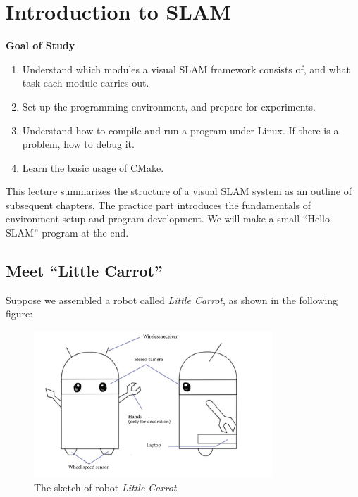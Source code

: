 \chapter{Introduction to SLAM}
\label{cpt:2}
\begin{mdframed}
	\textbf{Goal of Study}
	\begin{enumerate}[labelindent=0em,leftmargin=1.5em]
		\item Understand which modules a visual SLAM framework consists of, and what task each module carries out.
		\item Set up the programming environment, and prepare for experiments.
		\item Understand how to compile and run a program under Linux. If there is a problem, how to debug it.
		\item Learn the basic usage of CMake.
	\end{enumerate}
\end{mdframed}

This lecture summarizes the structure of a visual SLAM system as an outline of subsequent chapters. The practice part introduces the fundamentals of environment setup and program development. We will make a small ``Hello SLAM'' program at the end.

\newpage
%

\section{Meet ``Little Carrot''}
Suppose we assembled a robot called \emph{Little Carrot}, as shown in the following figure:

\begin{figure}
	\centering
	\includegraphics[width=0.8\textwidth]{resources/whatIsSLAM/carrot.pdf}
	\caption{The sketch of robot \emph{Little Carrot}}
\end{figure}

